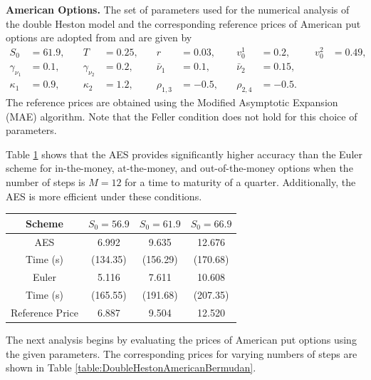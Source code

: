 \documentclass[]{interact}
\theoremstyle{plain}%
\theoremstyle{definition}
\theoremstyle{remark}
\begin{document}
\textbf{American Options.} The set of parameters used for the numerical analysis of the double Heston model and the corresponding reference prices of American put options are adopted from \cite{zhang2019american} and are given by
\begin{equation*}
\begin{aligned}
S_0 &= 61.9, &\quad T &= 0.25, &\quad r &= 0.03, &\quad v^1_0 &= 0.2, &\quad v^2_0 &= 0.49, \\
\gamma_{\nu_{1}} &= 0.1, &\quad \gamma_{\nu_{2}}&= 0.2, &\quad \bar{\nu}_1 &= 0.1, &\quad \bar{\nu}_2 &= 0.15, \\
\kappa_1 &= 0.9, &\quad \kappa_2 &= 1.2, &\quad \rho_{1,3} &= -0.5, &\quad\rho_{2,4} &= -0.5.
\end{aligned}
\label{eq:DoubleHestonModelParameters}
\end{equation*}
The reference prices are obtained using the Modified Asymptotic Expansion (MAE) algorithm. Note that the Feller condition does not hold for this choice of parameters.

Table \ref{table:DoubleHeston} shows that the AES provides significantly higher accuracy than the Euler scheme for in-the-money, at-the-money, and out-of-the-money options when the number of steps is $M = 12$  for a time to maturity of a quarter. Additionally, the AES is more efficient under these conditions.

\begin{table}
{\begin{tabular}{cccc} 
\toprule
Scheme &  $S_0 = 56.9$ & $S_0 = 61.9$ & $S_0 = 66.9$ \\ 
\midrule
AES    & 6.992 & 9.635 & 12.676 \\ 
Time (s)  & (134.35) & (156.29) & (170.68) \\ 
\midrule
Euler  & 5.116 & 7.611 & 10.608 \\ 
Time (s)  & (165.55) & (191.68) & (207.35) \\ 
\midrule
Reference Price & 6.887 & 9.504 & 12.520 \\
\bottomrule
\end{tabular}}
\label{table:DoubleHeston}
\end{table}



The next analysis begins by evaluating the prices of American put options using the given parameters. The corresponding prices for varying numbers of steps are shown in Table \ref{table:DoubleHestonAmericanBermudan}. 
\end{document}
